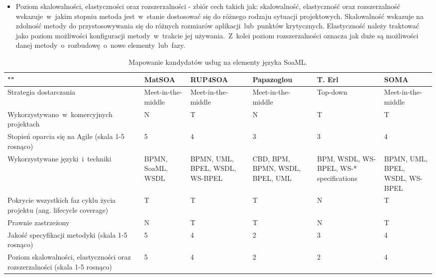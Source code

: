 \begin{itemize}
\item{Poziom skalowalności, elastyczności oraz rozszerzalności - zbiór cech takich jak: skalowalność, elastyczność oraz rozszerzalność wskazuje~w~jakim stopniu metoda jest~w~stanie dostosować się do różnego rodzaju sytuacji projektowych. Skalowalność wskazuje na zdolność metody do przystosowywania się do różnych rozmiarów aplikacji~lub~punktów krytycznych. Elastyczność należy traktować jako poziom możliwości konfiguracji metody~w~trakcie jej używania.~Z~kolei poziom rozszerzalności oznacza jak duże są możliwości danej metody~o~rozbudowę~o~nowe elementy~lub~fazy. }
\end{itemize}

\begin{table}[!htbp]
\begin{center}
\begin{small}
\begin{supertabular}{|p{4cm}|p{2cm}|p{2cm}|p{2.2cm}|p{2cm}|p{2cm}|}\hline
\textbf{""} & \textbf{MatSOA} & \textbf{RUP4SOA} & \textbf{Papazoglou} & \textbf{T. Erl} & \textbf{SOMA}\\\hline
Strategia dostarczania & Meet-in-the-middle & Meet-in-the-middle & Meet-in-the-middle & Top-down & Meet-in-the-middle\\\hline
Wykorzystywano~w~komercyjnych projektach & N & T & N & T & T \\\hline
Stopień oparcia się na Agile (skala 1-5 rosnąco) & 5 & 4 & 3 & 3 & 4 \\\hline
Wykorzystywane języki~i~techniki & BPMN, SoaML, WSDL& BPMN, UML, BPEL, WSDL, WS-BPEL & CBD, BPM, BPMN, WSDL, BPEL, UML & BPM, WSDL, WS-BPEL, WS-* specifications & BPMN, UML, BPEL, WSDL, WS-BPEL \\\hline
Pokrycie wszystkich faz cyklu życia projektu (ang. lifecycle coverage) & T & T & T & N & T \\\hline
Prawnie zastrzeżony & N & T & T & N & T \\\hline
Jakość specyfikacji metodyki (skala 1-5 rosnąco) & 5 & 4 & 2 & 3 & 4 \\\hline
Poziom skalowalności, elastyczności oraz rozszerzalności (skala 1-5 rosnąco)  & 5 &4 & 2 & 2 & 4 \\\hline

\end{supertabular}
\end{small}
\end{center}
 \caption{Mapowanie kandydatów usług na elementy języka SoaML.}
 \label{tabela_methods_comparison}
\end{table}
 
